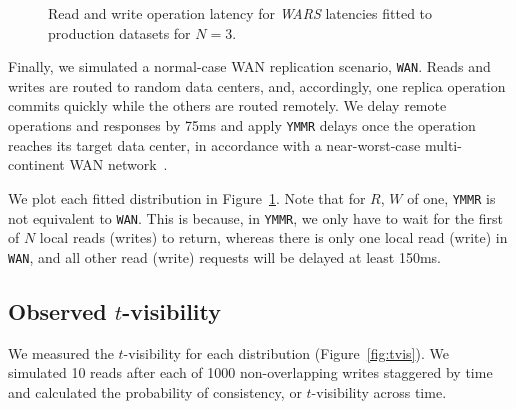 \documentclass{vldb}
\begin{document}
\begin{figure}
\caption{Read and write operation latency for \textit{WARS} latencies fitted
  to production datasets for $N$$=$$3$.}
\label{fig:latencies}
\end{figure}

Finally, we simulated a normal-case WAN replication scenario,
\texttt{WAN}.  Reads and writes are routed to random data centers,
and, accordingly, one replica operation commits quickly while the
others are routed remotely.  We delay remote operations and responses
by 75ms and apply \texttt{YMMR} delays once the operation reaches its
target data center, in accordance with a near-worst-case
multi-continent WAN network~\cite{dean-keynote}.

We plot each fitted distribution in Figure~\ref{fig:latencies}.  Note
that for $R$, $W$ of one, \texttt{YMMR} is not equivalent to
\texttt{WAN}.  This is because, in \texttt{YMMR}, we only have to wait
for the first of $N$ local reads (writes) to return, whereas there is
only one local read (write) in \texttt{WAN}, and all other read
(write) requests will be delayed at least 150ms.

\subsection{Observed $t$-visibility}

We measured the $t$-visibility for each distribution
(Figure~\ref{fig:tvis}).  We simulated 10 reads
after each of 1000 non-overlapping writes staggered by time
and calculated the probability of consistency, or 
$t$-visibility across time.
\end{document}

